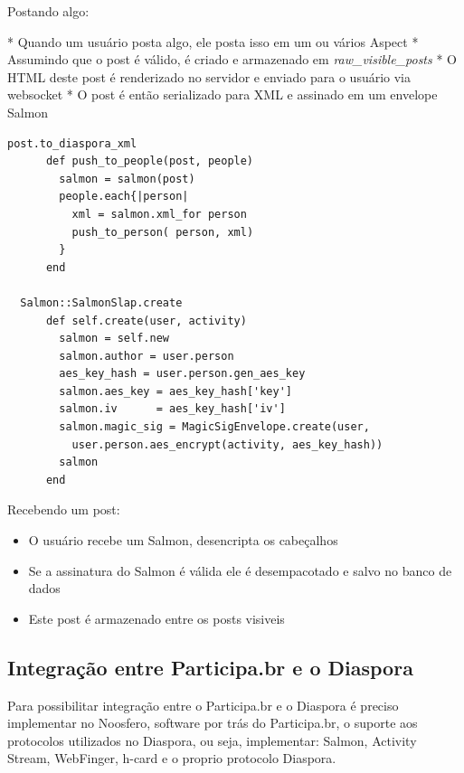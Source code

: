 \documentclass[12pt]{article}
\begin{document}
Postando algo:

* Quando um usuário posta algo, ele posta isso em um ou vários Aspect
* Assumindo que o post é válido, é criado e armazenado em {\it raw\_visible\_posts}
* O HTML deste post é renderizado no servidor e enviado para o usuário via websocket
* O post é então serializado para XML e assinado em um envelope Salmon

\begin{framed}
\begin{lstlisting}[caption=Exemplo envio de mensagem e como o Diaspora serializa para XML]
  post.to_diaspora_xml
      def push_to_people(post, people)
        salmon = salmon(post)
        people.each{|person|
          xml = salmon.xml_for person
          push_to_person( person, xml)
        }
      end
  
  Salmon::SalmonSlap.create
      def self.create(user, activity)
        salmon = self.new
        salmon.author = user.person
        aes_key_hash = user.person.gen_aes_key
        salmon.aes_key = aes_key_hash['key']
        salmon.iv      = aes_key_hash['iv']
        salmon.magic_sig = MagicSigEnvelope.create(user,
          user.person.aes_encrypt(activity, aes_key_hash))
        salmon
      end
\end{lstlisting}
\end{framed}

Recebendo um post:

\begin{itemize}
  \item O usuário recebe um Salmon, desencripta os cabeçalhos
  \item Se a assinatura do Salmon é válida ele é desempacotado e salvo no banco de dados
  \item Este post é armazenado entre os posts visiveis
\end{itemize}

\subsection{Integração entre Participa.br e o Diaspora}


Para possibilitar integração entre o Participa.br e o Diaspora é preciso
implementar no Noosfero, software por trás do Participa.br, o suporte aos
protocolos utilizados no Diaspora, ou seja, implementar: Salmon, Activity
Stream, WebFinger, h-card e o proprio protocolo Diaspora.
\end{document}
